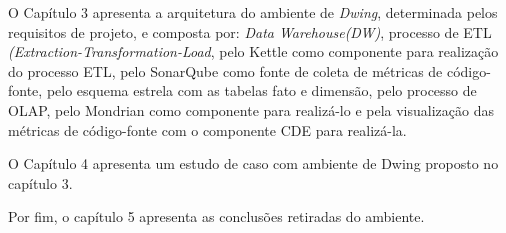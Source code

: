 O Capítulo 3 apresenta a arquitetura do ambiente de \textit{Dwing}, determinada pelos 
requisitos de projeto, e composta por: \textit{Data Warehouse(DW)},  processo de ETL 
\textit{(Extraction-Transformation-Load}, pelo Kettle como 
componente para realização do processo ETL, pelo SonarQube como fonte de coleta de métricas de 
código-fonte, pelo esquema estrela com as tabelas fato e dimensão, pelo processo de 
OLAP, pelo Mondrian como componente para realizá-lo e pela visualização das métricas 
de código-fonte com o componente CDE para realizá-la.

 
O Capítulo 4 apresenta um estudo de caso com ambiente de Dwing proposto no 
capítulo 3. 

Por fim, o capítulo 5 apresenta as conclusões retiradas do ambiente.

